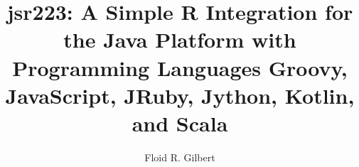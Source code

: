 \documentclass[]{statthesisMEMOIR}
\title{jsr223: A Simple R Integration for the Java Platform with Programming Languages Groovy, JavaScript, JRuby, Jython, Kotlin, and Scala}
\author{Floid R. Gilbert}
\begin{document}






\nocite{*}
	
	
\end{document}
